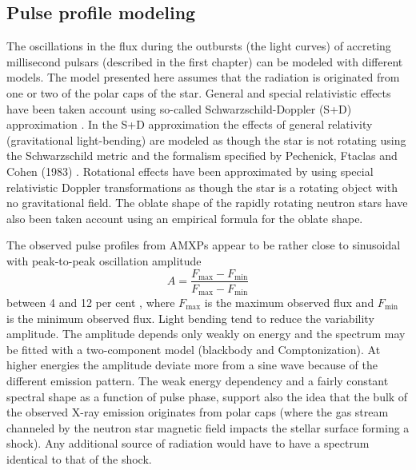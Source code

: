 \documentclass{wihuri}
\def\be{\begin{equation}}
\def\ee{\end{equation}}
\begin{document}
\subsection{Pulse profile modeling}


The oscillations in the flux during the outbursts (the light curves) of accreting millisecond pulsars (described in the first chapter) can be modeled with different models. The model presented here assumes that the radiation is originated from one or two of the polar caps of the star. General and special relativistic effects have been taken account using so-called Schwarzschild-Doppler (S+D) approximation %
\cite{millerlamb98}%
\cite{poutagierlinskisax}. In the S+D approximation the effects of general relativity (gravitational light-bending) are modeled as though the star is not rotating using the Schwarzschild metric and the formalism specified by
Pechenick, Ftaclas and Cohen (1983) \cite{pechenick}. Rotational effects have been approximated by using special relativistic Doppler transformations as though the star is a rotating object with no gravitational field. The oblate shape of the rapidly rotating neutron stars have also been taken account using an empirical formula for the oblate shape.


The observed pulse profiles from AMXPs appear to be rather close to sinusoidal with peak-to-peak oscillation amplitude 
\be \label{eq:amplitude}
A = \frac{F_{\mathrm{max}} - F_{\mathrm{min}}} {F_{\mathrm{max}} - F_{\mathrm{min}}}
\ee %
 between 4 and 12 per cent \cite{poutarew2006}, where $F_{\mathrm{max}}$ is the maximum observed flux and $F_{\mathrm{min}}$ is the minimum observed flux. Light bending tend %
to reduce the variability amplitude. The amplitude depends only weakly on energy and the spectrum may be fitted with a two-component model (blackbody and Comptonization). At higher energies the amplitude deviate more from a sine wave because of the different emission pattern. The weak energy dependency and a fairly constant spectral shape as a function of pulse phase, support also the idea that the bulk of the observed X-ray emission originates from polar caps (where the gas stream channeled by the neutron star magnetic field impacts the stellar surface forming a shock). Any additional source of radiation would have to have a spectrum identical to that of the shock.
\end{document}
